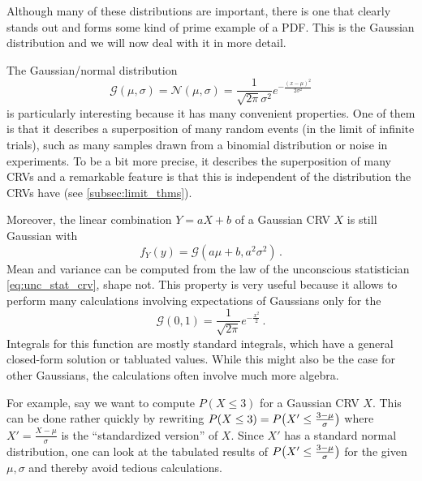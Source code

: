 Although many of these distributions are important, there is one that clearly stands out and forms some kind of prime example of a PDF. This is the Gaussian distribution and we will now deal with it in more detail.

\begin{ex}
The Gaussian/normal distribution
\begin{equation*}
\mathcal{G}(\mu, \sigma) = \mathcal{N}(\mu, \sigma) = \frac{1}{\sqrt{2 \pi} \sigma^2} e^{- \frac{(x - \mu)^2}{2\sigma^2}}
\end{equation*}
is particularly interesting because it has many convenient properties. One of them is that it describes a superposition of many random events (in the limit of infinite trials), such as many samples drawn from a binomial distribution or noise in experiments. To be a bit more precise, it describes the superposition of many CRVs and a remarkable feature is that this is independent of the distribution the CRVs have (see \ref{subsec:limit_thms}).

Moreover, the linear combination $Y = a X + b$ of a Gaussian CRV $X$ is still Gaussian with
\begin{equation}
f_Y(y) = \mathcal{G}(a \mu + b, a^2 \sigma^2) \, .
\end{equation}
Mean and variance can be computed from the law of the unconscious statistician \eqref{eq:unc_stat_crv}, shape not. This property is very useful because it allows to perform many calculations involving expectations of Gaussians only for the 
\begin{equation}
\mathcal{G}(0, 1) = \frac{1}{\sqrt{2 \pi}} e^{- \frac{x^2}{2}} \, .
\end{equation}
Integrals for this function are mostly standard integrals, which have a general closed-form solution or tabluated values. While this might also be the case for other Gaussians, the calculations often involve much more algebra.

For example, say we want to compute $P(X \leq 3)$ for a Gaussian CRV $X$. This can be done rather quickly by rewriting $P(X \leq 3) = P\qty(X' \leq \frac{3 - \mu}{\sigma})$ where $X' = \frac{X - \mu}{\sigma}$ is the \enquote{standardized version} of $X$. Since $X'$ has a standard normal distribution, one can look at the tabulated results of $P\qty(X' \leq \frac{3 - \mu}{\sigma})$ for the given $\mu, \sigma$ and thereby avoid tedious calculations.
\end{ex}


